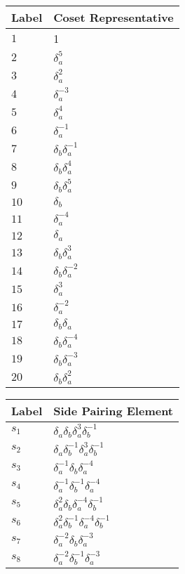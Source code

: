 \documentclass{article}
\begin{document}
\begin{center}
\begin{tabular}{ll}
\toprule
Label & Coset Representative\\
\midrule
$1$ & 1 \\
$2$ & $\delta_a^{5}$ \\
$3$ & $\delta_a^{2}$ \\
$4$ & $\delta_a^{-3}$ \\
$5$ & $\delta_a^{4}$ \\
$6$ & $\delta_a^{-1}$ \\
$7$ & $\delta_b^{}\delta_a^{-1}$ \\
$8$ & $\delta_b^{}\delta_a^{4}$ \\
$9$ & $\delta_b^{}\delta_a^{5}$ \\
$10$ & $\delta_b^{}$ \\
$11$ & $\delta_a^{-4}$ \\
$12$ & $\delta_a^{}$ \\
$13$ & $\delta_b^{}\delta_a^{3}$ \\
$14$ & $\delta_b^{}\delta_a^{-2}$ \\
$15$ & $\delta_a^{3}$ \\
$16$ & $\delta_a^{-2}$ \\
$17$ & $\delta_b^{}\delta_a^{}$ \\
$18$ & $\delta_b^{}\delta_a^{-4}$ \\
$19$ & $\delta_b^{}\delta_a^{-3}$ \\
$20$ & $\delta_b^{}\delta_a^{2}$ \\
\bottomrule
\end{tabular}
\hfill
\begin{tabular}{ll}
\toprule
Label & Side Pairing Element\\
\midrule
$s_{1}$ & $\delta_a^{}\delta_b^{}\delta_a^{3}\delta_b^{-1}$ \\
$s_{2}$ & $\delta_a^{}\delta_b^{-1}\delta_a^{3}\delta_b^{-1}$ \\
$s_{3}$ & $\delta_a^{-1}\delta_b^{}\delta_a^{-4}$ \\
$s_{4}$ & $\delta_a^{-1}\delta_b^{-1}\delta_a^{-4}$ \\
$s_{5}$ & $\delta_a^{2}\delta_b^{}\delta_a^{-4}\delta_b^{-1}$ \\
$s_{6}$ & $\delta_a^{2}\delta_b^{-1}\delta_a^{-4}\delta_b^{-1}$ \\
$s_{7}$ & $\delta_a^{-2}\delta_b^{}\delta_a^{-3}$ \\
$s_{8}$ & $\delta_a^{-2}\delta_b^{-1}\delta_a^{-3}$ \\

\end{tabular}
\end{center}
\end{document}
